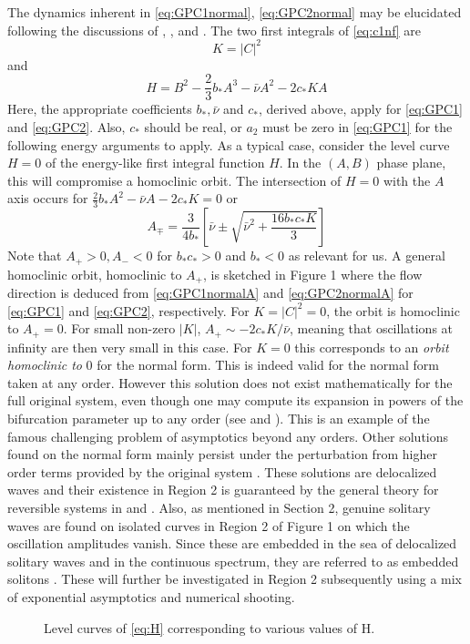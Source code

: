 The dynamics inherent in \eqref{eq:GPC1normal}, \eqref{eq:GPC2normal} may be elucidated following the discussions of \cite{IA}, \cite{IK}, \cite{Lombardi1} and \cite{Lombardi2}.
The two first integrals of \eqref{eq:c1nf}  are
\begin{equation}
K = \left| C \right|^2
\end{equation}
and
\begin{equation}\label{eq:H}
H = B^2 - \frac{2}{3} b_* A^3 - \bar{\nu} A^2 - 2 c_* K A
\end{equation}
Here, the appropriate coefficients $b_*, \bar{\nu}$ and $ c_*$, derived above,
apply for \eqref{eq:GPC1} and \eqref{eq:GPC2}.  Also, $c_*$ should be real, or
$a_2$ must be zero in \eqref{eq:GPC1} for the following energy arguments to
apply.  As a typical case, consider  the level curve $H=0$ of the energy-like
first integral function $H$. In the $(A,B)$ phase plane,
this will compromise a homoclinic orbit. The intersection of $H=0$ with the 
$A$ axis occurs for $ \frac{2}{3} b_* A^2 - \bar{\nu}A - 2 c_* K = 0$ or
\begin{equation}
A_{\mp} = \frac{3}{4 b_*} \left[ \bar{\nu} \pm \sqrt{ \bar{\nu}^2 + \frac{16 b_* c_* K}{3} } \right]
\end{equation}
Note that $A_+ > 0, A_- < 0 $ for $b_* c_* > 0 $ and $b_* < 0$ as relevant for
us. A general homoclinic orbit, homoclinic to $A_+$, is sketched in Figure 1
where the flow direction is deduced from \eqref{eq:GPC1normalA} and
\eqref{eq:GPC2normalA} for \eqref{eq:GPC1} and \eqref{eq:GPC2}, respectively.
For $K=\left|C\right|^2 = 0 $, the orbit is homoclinic to $A_+=0$. For small
non-zero $\left|K\right|$, $ A_+ \sim - 2 c_* K / \bar{\nu}$, meaning that
oscillations at infinity are then very small in this case. For $K=0$ this
corresponds to an \emph{orbit homoclinic to} 0 for the normal form. This is
indeed valid for the normal form taken at any order. However this solution does
not exist mathematically for the full original system, even though one may
compute its expansion in powers of the bifurcation parameter up to any order
(see \cite{Lombardi1} and \cite{Lombardi2}). This is an example of the famous
challenging problem of asymptotics beyond any orders. Other solutions found on
the normal form mainly persist under the perturbation from higher order terms
provided by the original system \cite{IK}. These solutions are delocalized
waves and their existence in Region 2 is guaranteed by the general theory for
reversible systems in \cite{Lombardi1} and \cite{Lombardi2}. Also, as mentioned
in Section 2, genuine solitary waves are found on isolated curves in Region 2
of Figure 1 on which the oscillation amplitudes vanish. Since these are
embedded in the sea of delocalized solitary waves and in the continuous
spectrum, they are referred to as embedded solitons \cite{CMYK}. These will
further be investigated in Region 2 subsequently using a mix of exponential
asymptotics and numerical shooting.

\begin{figure}[hh]
\begin{center}
\label{fig:homoclinic}
\caption{Level curves of \eqref{eq:H} corresponding to various values of H.}
\end{center}
\end{figure}
